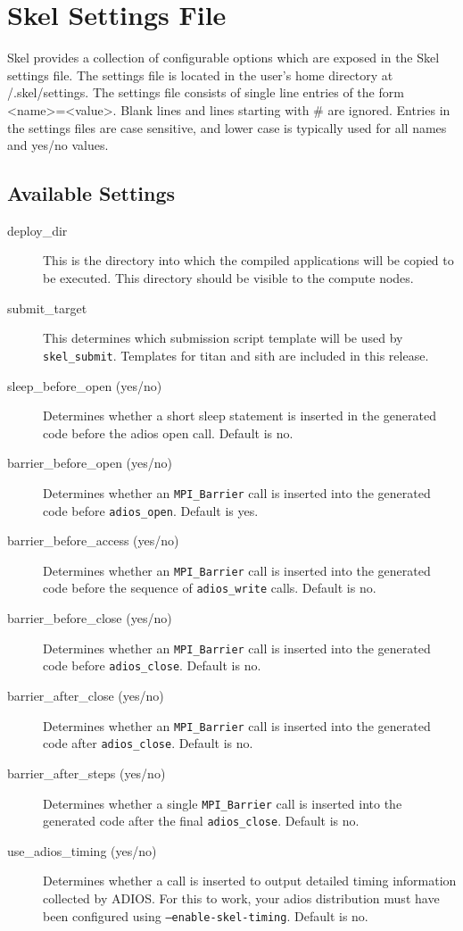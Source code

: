

\chapter{Skel Settings File}
Skel provides a collection of configurable options which are exposed in the
Skel settings file. The settings file is located in the user's home directory at
/.skel/settings.
The settings file consists of single line entries of the form
<name>=<value>.
Blank lines and lines starting with \# are ignored. Entries in the settings files are
case sensitive, and lower case is typically used for all names and yes/no values.
\section{Available Settings}
\begin{description}
  \item[deploy\_dir]
This is the directory into which the compiled applications will be
copied to be executed. This directory should be visible to the compute
nodes.
  \item[submit\_target]
This determines which submission script template will be used
by
{\tt skel\_submit}. Templates for titan and sith are included in this
release.
  \item[sleep\_before\_open (yes/no)]
Determines whether a short sleep statement is inserted in the generated 
code before the adios open call. Default is no.
  \item[barrier\_before\_open (yes/no)]
Determines whether an {\tt MPI\_Barrier} call is inserted into the 
generated code before {\tt adios\_open}. Default is yes.
  \item[barrier\_before\_access (yes/no)]
Determines whether an {\tt MPI\_Barrier} call is
inserted into the generated code before the sequence of
{\tt adios\_write} calls. Default is no.
  \item[barrier\_before\_close (yes/no)]
Determines whether an {\tt MPI\_Barrier}
call is inserted into the generated code before {\tt adios\_close}.
Default is no.
  \item[barrier\_after\_close (yes/no)]
Determines whether an {\tt MPI\_Barrier} call is inserted
into the generated code after {\tt adios\_close}. Default is no.
  \item[barrier\_after\_steps (yes/no)]
Determines whether a single {\tt MPI\_Barrier} call
is inserted into the generated code after the final
{\tt adios\_close}. Default is no.
  \item[use\_adios\_timing (yes/no)]
Determines whether a call is inserted to output
detailed timing information collected by ADIOS. For this to work, your
adios distribution must have been configured using
{\tt --enable-skel-timing}.
Default is no.
\end{description}

